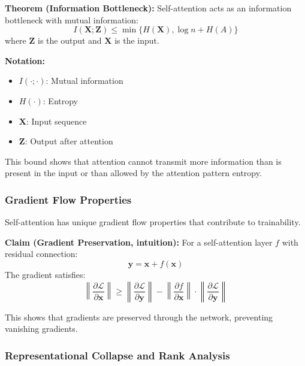 \textbf{Theorem (Information Bottleneck):} Self-attention acts as an information bottleneck with mutual information:
\begin{equation}
I(\mathbf{X}; \mathbf{Z}) \leq \min\{H(\mathbf{X}), \log n + H(A)\}
\end{equation}
where $\mathbf{Z}$ is the output and $\mathbf{X}$ is the input.

\begin{notationbox}
\textbf{Notation:}
\begin{itemize}
    \item $I(\cdot; \cdot)$: Mutual information
    \item $H(\cdot)$: Entropy
    \item $\mathbf{X}$: Input sequence
    \item $\mathbf{Z}$: Output after attention
\end{itemize}
\end{notationbox}

This bound shows that attention cannot transmit more information than is present in the input or than allowed by the attention pattern entropy.

\subsubsection{Gradient Flow Properties}

Self-attention has unique gradient flow properties that contribute to trainability.

\textbf{Claim (Gradient Preservation, intuition):} For a self-attention layer $f$ with residual connection:
\begin{equation}
\mathbf{y} = \mathbf{x} + f(\mathbf{x})
\end{equation}
The gradient satisfies:
\begin{equation}
\left\|\frac{\partial \mathcal{L}}{\partial \mathbf{x}}\right\| \geq \left\|\frac{\partial \mathcal{L}}{\partial \mathbf{y}}\right\| - \left\|\frac{\partial f}{\partial \mathbf{x}}\right\| \cdot \left\|\frac{\partial \mathcal{L}}{\partial \mathbf{y}}\right\|
\end{equation}

This shows that gradients are preserved through the network, preventing vanishing gradients.

\subsubsection{Representational Collapse and Rank Analysis}

